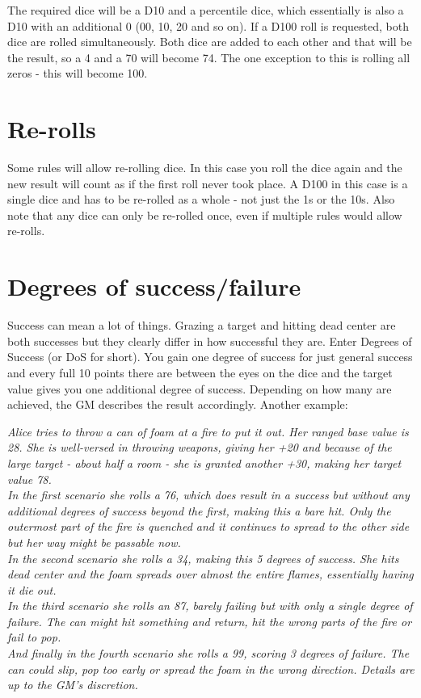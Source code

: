 \documentclass[12pt,a4paper,openany,usenames,dvipsnames]{book}
\begin{document}
	The required dice will be a D10 and a percentile dice, which essentially is also a D10 with an additional 0 (00, 10, 20 and so on). If a D100 roll is requested, both dice are rolled simultaneously. Both dice are added to each other and that will be the result, so a 4 and a 70 will become 74. The one exception to this is rolling all zeros - this will become 100.
	\section{Re-rolls}
	Some rules will allow re-rolling dice. In this case you roll the dice again and the new result will count as if the first roll never took place. A D100 in this case is a single dice and has to be re-rolled as a whole - not just the 1s or the 10s.
	Also note that any dice can only be re-rolled once, even if multiple rules would allow re-rolls.
	\section{Degrees of success/failure}
	Success can mean a lot of things. Grazing a target and hitting dead center are both successes but they clearly differ in how successful they are. Enter Degrees of Success (or DoS for short). You gain one degree of success for just general success and every full 10 points there are between the eyes on the dice and the target value gives you one additional degree of success. Depending on how many are achieved, the GM describes the result accordingly.
	Another example:

	\begin{exampleblock}\textit{
	Alice tries to throw a can of foam at a fire to put it out. Her ranged base value is 28. She is well-versed in throwing weapons, giving her +20 and because of the large target - about half a room - she is granted another +30, making her target value 78.\\
	In the first scenario she rolls a 76, which does result in a success but without any additional degrees of success beyond the first, making this a bare hit. Only the outermost part of the fire is quenched and it continues to spread to the other side but her way might be passable now.\\
	In the second scenario she rolls a 34, making this 5 degrees of success. She hits dead center and the foam spreads over almost the entire flames, essentially having it die out.\\
	In the third scenario she rolls an 87, barely failing but with only a single degree of failure. The can might hit something and return, hit the wrong parts of the fire or fail to pop.\\
	And finally in the fourth scenario she rolls a 99, scoring 3 degrees of failure. The can could slip, pop too early or spread the foam in the wrong direction. Details are up to the GM's discretion.
		}
	\end{exampleblock}
\end{document}
